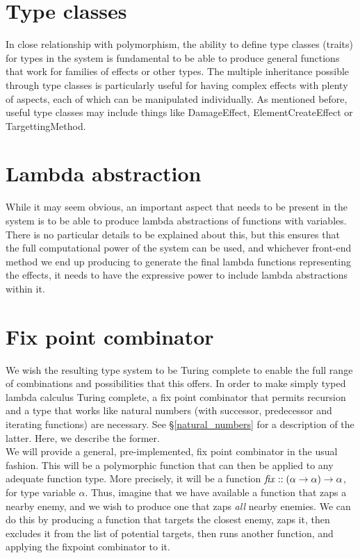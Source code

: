\documentclass[12pt,a4paper]{article}
\begin{document}
\section{Type classes}
\label{type_classes}

In close relationship with polymorphism, the ability to define type classes (traits) for types in the system is fundamental to be able to produce general functions that work for families of effects or other types. The multiple inheritance possible through type classes is particularly useful for having complex effects with plenty of aspects, each of which can be manipulated individually. As mentioned before, useful type classes may include things like DamageEffect, ElementCreateEffect or TargettingMethod.

\section{Lambda abstraction}

While it may seem obvious, an important aspect that needs to be present in the system is to be able to produce lambda abstractions of functions with variables. There is no particular details to be explained about this, but this ensures that the full computational power of the system can be used, and whichever front-end method we end up producing to generate the final lambda functions representing the effects, it needs to have the expressive power to include lambda abstractions within it.

\section{Fix point combinator}

We wish the resulting type system to be Turing complete to enable the full range of combinations and possibilities that this offers. In order to make simply typed lambda calculus Turing complete, a fix point combinator that permits recursion and a type that works like natural numbers (with successor, predecessor and iterating functions) are necessary. See \S \ref{natural_numbers} for a description of the latter. Here, we describe the former.\\

We will provide a general, pre-implemented, fix point combinator in the usual fashion. This will be a polymorphic function that can then be applied to any adequate function type. More precisely, it will be a function ${\it{fix}} :: (\alpha \rightarrow \alpha) \rightarrow \alpha$, for type variable $\alpha$. Thus, imagine that we have available a function that zaps a nearby enemy, and we wish to produce one that zaps \emph{all} nearby enemies. We can do this by producing a function that targets the closest enemy, zaps it, then excludes it from the list of potential targets, then runs another function, and applying the fixpoint combinator to it.
\end{document}

